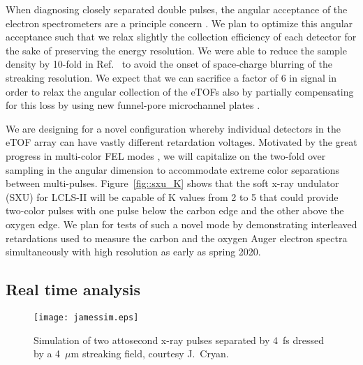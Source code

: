 When diagnosing closely separated double pulses, the angular acceptance of the electron spectrometers are a principle concern \cite{Worner2018}.
We plan to optimize this angular acceptance such that we relax slightly the collection efficiency of each detector for the sake of preserving the energy resolution.
We were able to reduce the sample density by 10-fold in Ref.~\cite{Nick2018} to avoid the onset of space-charge blurring of the streaking resolution.
We expect that we can sacrifice a factor of 6 in signal in order to relax the angular collection of the eTOFs also by partially compensating for this loss by using new funnel-pore microchannel plates \cite{funnelMCPcompare2018}.


We are designing for a novel configuration whereby individual detectors in the eTOF array can have vastly different retardation voltages.
Motivated by the great progress in multi-color FEL modes \cite{Lutman13_twocolor,Marinelli13_twocolor,Allaria2014,Marinelli2015,Prince2016,Lutman2016,Marinelli2016,LutmanFreshSlice2016}, we will capitalize on the two-fold over sampling in the angular dimension to accommodate extreme color separations between multi-pulses.
Figure~\ref{fig::sxu_K} shows that the soft x-ray undulator (SXU) for LCLS-II will be capable of K values from 2 to 5 that could provide two-color pulses with one pulse below the carbon edge and the other above the oxygen edge.
We plan for tests of such a novel mode by demonstrating interleaved retardations used to measure the carbon and the oxygen Auger electron spectra simultaneously with high resolution as early as spring 2020.



\subsection*{Real time analysis}
%
\begin{wrapfigure}[20]{r}{3.5in}
\vspace{-0.5\baselineskip}
\centerline{\texttt{[image: jamessim.eps]}}
\vspace{-0.5\baselineskip}
\caption{\label{fig::jamessim}Simulation of two attosecond x-ray pulses separated by 4~fs dressed by a 4~$\mu$m streaking field, courtesy J.~Cryan.}
\end{wrapfigure}


